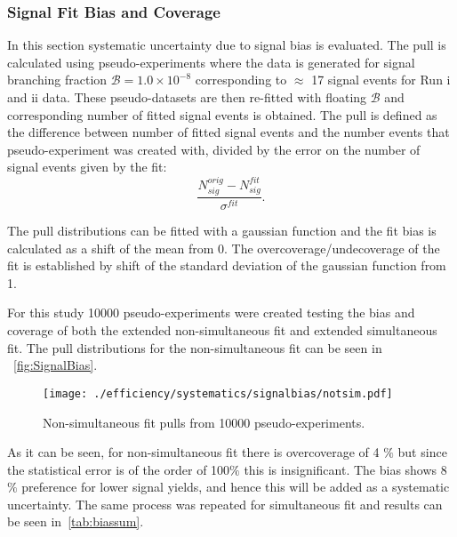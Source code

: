 \subsubsection{Signal Fit Bias and Coverage}
In this section systematic uncertainty due to signal bias is evaluated. The pull is calculated using pseudo-experiments where the data is generated for signal branching fraction $\mathcal{B}= 1.0\times 10^{-8}$ corresponding to $\approx$ 17 signal events for Run \Rn{1} and \Rn{2} data.
These pseudo-datasets are then re-fitted with floating $\mathcal{B}$ and corresponding number of fitted signal events is obtained. The pull is defined as the difference between number of fitted signal events and the number events that pseudo-experiment was created with, divided by the error on the number of signal events given by the fit:
\begin{equation}
\frac{N^{orig}_{sig}-N^{fit}_{sig}}{\sigma^{fit}}.
\end{equation}

The pull distributions can be fitted with a gaussian function and the fit bias is calculated as a shift of the mean from 0. The overcoverage/undecoverage of the fit is established by shift of the standard deviation of the gaussian function from 1.

For this study 10000 pseudo-experiments were created testing the bias and coverage of both the extended non-simultaneous fit and extended simultaneous fit. The pull distributions for the non-simultaneous fit can be seen in ~\autoref{fig:SignalBias}.
\begin{figure}[H]
\centering
\texttt{[image: ./efficiency/systematics/signalbias/notsim.pdf]}
\caption{Non-simultaneous fit pulls from 10000 pseudo-experiments.}
\label{fig:SignalBias}
\end{figure}

As it can be seen, for non-simultaneous fit there is overcoverage of 4 $\%$ but since the statistical error is of the order of 100$\%$ this is insignificant.
The bias shows 8$\%$ preference for lower signal yields, and hence this will be added as a systematic uncertainty. The same process was repeated for simultaneous fit and results can be seen in~\autoref{tab:biassum}. 

